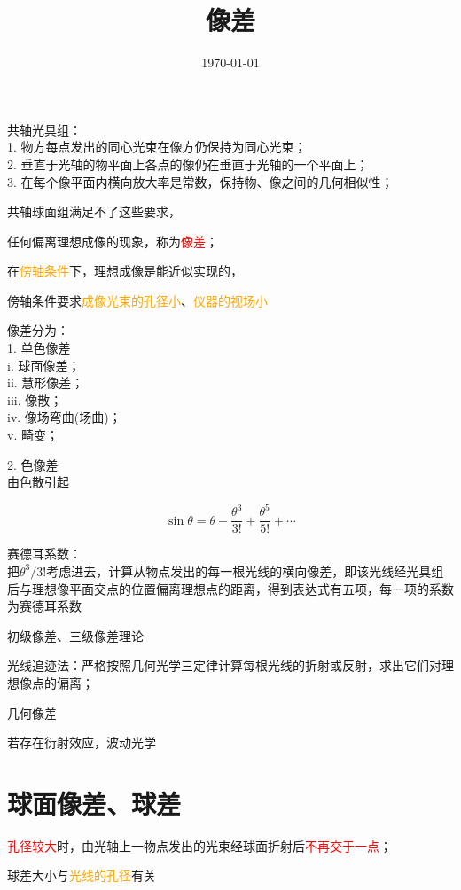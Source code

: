 \documentclass[12pt,a4paper]{article}
\title{像差}
\author{}
\date{\today}
\begin{document}
\maketitle

共轴光具组：\\
1. 物方每点发出的同心光束在像方仍保持为同心光束；\\
2. 垂直于光轴的物平面上各点的像仍在垂直于光轴的一个平面上；\\
3. 在每个像平面内横向放大率是常数，保持物、像之间的几何相似性；

共轴球面组满足不了这些要求，

任何偏离理想成像的现象，称为\textcolor{red}{像差}；

在\textcolor{orange}{傍轴条件}下，理想成像是能近似实现的，

傍轴条件要求\textcolor{orange}{成像光束的孔径小}、\textcolor{orange}{仪器的视场小}

像差分为：\\
1. 单色像差 \\
i. 球面像差；\\
ii. 慧形像差；\\
iii. 像散；\\
iv. 像场弯曲(场曲)；\\
v. 畸变；


2. 色像差 \\
由色散引起

\begin{equation}
\sin \theta = \theta -\frac{\theta^3}{3!} +\frac{\theta^5}{5!} +\cdots
\end{equation}


赛德耳系数：\\
把$\theta^3/3!$考虑进去，计算从物点发出的每一根光线的横向像差，即该光线经光具组后与理想像平面交点的位置偏离理想点的距离，得到表达式有五项，每一项的系数为赛德耳系数

初级像差、三级像差理论

光线追迹法：严格按照几何光学三定律计算每根光线的折射或反射，求出它们对理想像点的偏离；

几何像差

若存在衍射效应，波动光学

\section{球面像差、球差}
\textcolor{red}{孔径较大}时，由光轴上一物点发出的光束经球面折射后\textcolor{red}{不再交于一点}；

球差大小与\textcolor{orange}{光线的孔径}有关
\end{document}
